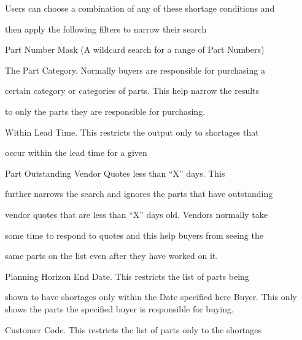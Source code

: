 \documentclass[letterpaper,10pt,english]{sphinxmanual}
\begin{document}
\begin{DUlineblock}{0em}
\item[] Users can choose a combination of any of these shortage conditions and
\item[] then apply the following filters to narrow their search
\end{DUlineblock}

Part Number Mask (A wildcard search for a range of Part Numbers)

\begin{DUlineblock}{0em}
\item[] The Part Category. Normally buyers are responsible for purchasing a
\item[] certain category or categories of parts. This help narrow the results
\end{DUlineblock}

to
\textbar{} only the parts they are responsible for purchasing.

\begin{DUlineblock}{0em}
\item[] Within Lead Time. This restricts the output only to shortages that
\end{DUlineblock}

occur within the lead
\textbar{} time for a given

\begin{DUlineblock}{0em}
\item[] Part Outstanding Vendor Quotes less than “X” days. This
\item[] further narrows the search and ignores the parts that have outstanding
\item[] vendor quotes that are less than “X” days old. Vendors normally take
\item[] some time to respond to quotes and this help buyers from seeing the
\end{DUlineblock}

same
\textbar{} parts on the list even after they have worked on it.

\begin{DUlineblock}{0em}
\item[] Planning Horizon End Date. This restricts the list of parts being
\end{DUlineblock}

shown to have shortages
\textbar{} only within the Date specified here Buyer. This only shows the parts
the
\textbar{} specified buyer is responsible for buying.

\begin{DUlineblock}{0em}
\item[] Customer Code. This restricts the list of parts only to the shortages
\end{DUlineblock}
\end{document}
